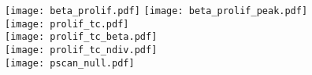 \documentclass[12pt,a4paper]{article}
\begin{document}
\texttt{[image: beta\_prolif.pdf]}
\texttt{[image: beta\_prolif\_peak.pdf]}\\
\texttt{[image: prolif\_tc.pdf]}\\
\texttt{[image: prolif\_tc\_beta.pdf]}\\
\texttt{[image: prolif\_tc\_ndiv.pdf]}\\
\texttt{[image: pscan\_null.pdf]}
\end{document}
